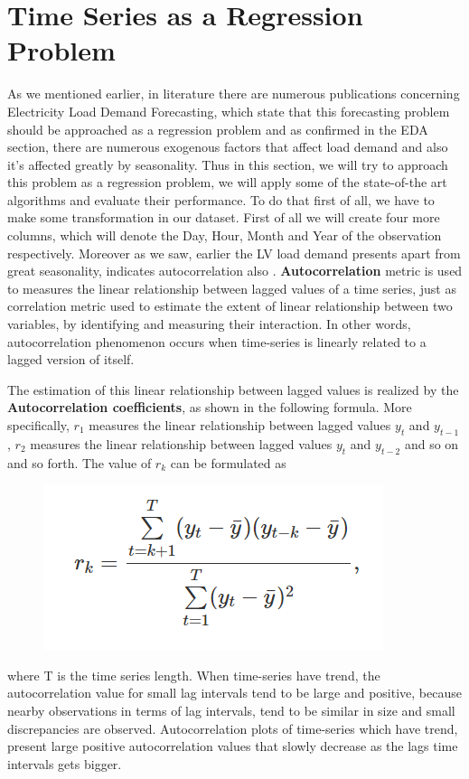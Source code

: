 \section{Time Series as a Regression Problem}
As we mentioned earlier, in literature there are numerous publications concerning Electricity Load Demand Forecasting, which state that this forecasting problem should be approached as a regression problem and as confirmed in the EDA section, there are numerous exogenous factors that affect load demand and also it's affected greatly by seasonality. Thus in this section, we will try to approach this problem as a regression problem, we will apply some of the state-of-the art algorithms and evaluate their performance. To do that first of all, we have to make some transformation in our dataset. First of all we will create four more columns, which will denote the Day, Hour, Month and Year of the observation respectively. Moreover as we saw, earlier the LV load demand presents apart from great seasonality, indicates autocorrelation also \cite{vanderplas2016python}. \textbf{Autocorrelation} metric is used to measures the linear relationship between lagged values of a time series, just as correlation metric used to estimate the extent of linear relationship between two variables, by identifying and measuring their interaction. In other words, autocorrelation phenomenon occurs when time-series is linearly related to a lagged version of itself.
\par The estimation of this linear relationship between lagged values is realized by the \textbf{Autocorrelation coefficients}, as shown in the following formula. More specifically, $r_{1}$ measures the linear relationship between lagged values $y_{t}$ and $y_{t-1}$, $r_{2}$ measures the linear relationship between lagged values $y_{t}$ and $y_{t-2}$ and so on and so forth. The value of $r_{k}$ can be formulated as
\begin{figure}[ht!]
\centering
\includegraphics[width=0.6\linewidth]{project/rk.PNG}

\end{figure}
where T is the time series length. When time-series have trend, the autocorrelation value for small lag intervals tend to be large and positive, because nearby observations in terms of lag intervals, tend to be similar in size and small discrepancies are observed. Autocorrelation plots of time-series which have trend, present large positive autocorrelation values that slowly decrease as the lags time intervals gets bigger. 
